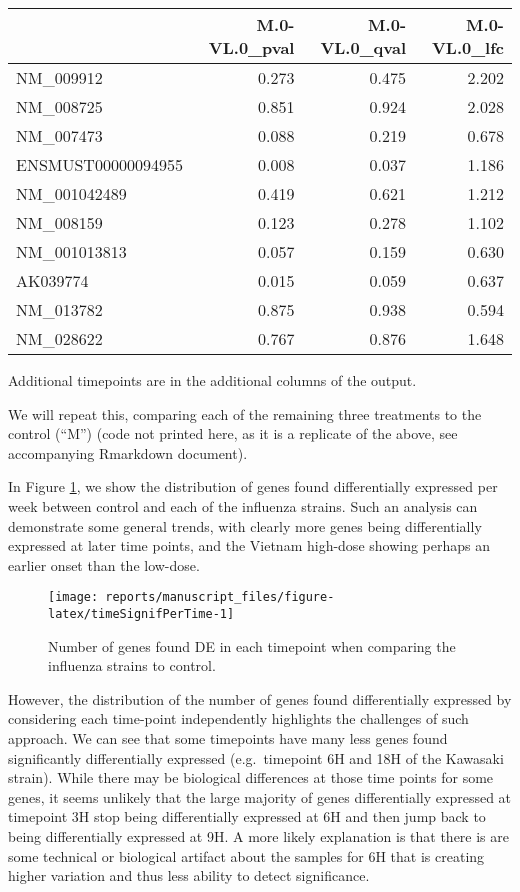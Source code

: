\documentclass[9pt,a4paper,]{extarticle}
\begin{document}
\begin{tabular}{lrrr}
\toprule
  & M.0-VL.0\_pval & M.0-VL.0\_qval & M.0-VL.0\_lfc\\
\midrule
NM\_009912 & 0.273 & 0.475 & 2.202\\
NM\_008725 & 0.851 & 0.924 & 2.028\\
NM\_007473 & 0.088 & 0.219 & 0.678\\
ENSMUST00000094955 & 0.008 & 0.037 & 1.186\\
NM\_001042489 & 0.419 & 0.621 & 1.212\\
\addlinespace
NM\_008159 & 0.123 & 0.278 & 1.102\\
NM\_001013813 & 0.057 & 0.159 & 0.630\\
AK039774 & 0.015 & 0.059 & 0.637\\
NM\_013782 & 0.875 & 0.938 & 0.594\\
NM\_028622 & 0.767 & 0.876 & 1.648\\
\bottomrule
\end{tabular}

Additional timepoints are in the additional columns of the output.

We will repeat this, comparing each of the remaining three treatments to the
control (``M'') (code not printed here, as it is a replicate of the above, see
accompanying Rmarkdown document).

In Figure \ref{fig:timeSignifPerTime}, we show the distribution of genes found differentially expressed per
week between control and each of the influenza strains. Such an analysis can demonstrate some general trends, with clearly more genes
being differentially expressed at later time points, and the Vietnam high-dose
showing perhaps an earlier onset than the low-dose.

\begin{figure}[H]

{\centering \texttt{[image: reports/manuscript\_files/figure-latex/timeSignifPerTime-1]} 

}

\caption{Number of genes found DE in each timepoint when comparing the influenza strains to control.}\label{fig:timeSignifPerTime}
\end{figure}

However, the distribution of the number of genes found differentially
expressed by considering each time-point independently highlights the
challenges of such approach. We can see that some timepoints have many less
genes found significantly differentially expressed (e.g.~timepoint 6H and 18H
of the Kawasaki strain). While there may be biological differences at those
time points for some genes, it seems unlikely that the large majority of genes
differentially expressed at timepoint 3H stop being differentially expressed
at 6H and then jump back to being differentially expressed at 9H. A more
likely explanation is that there is are some technical or biological artifact
about the samples for 6H that is creating higher variation and thus less
ability to detect significance.
\end{document}
